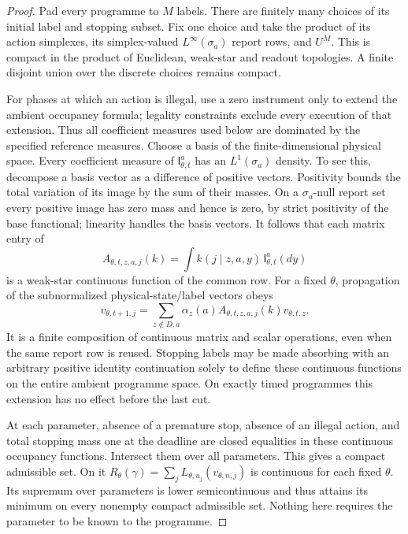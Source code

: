 \begin{proof}
Pad every programme to $M$ labels. There are finitely many choices of its initial label and stopping subset. Fix one choice and take the product of its action simplexes, its simplex-valued $L^\infty(\sigma_a)$ report rows, and $U^M$. This is compact in the product of Euclidean, weak-star and readout topologies. A finite disjoint union over the discrete choices remains compact.

For phases at which an action is illegal, use a zero instrument only to extend the ambient occupancy formula; legality constraints exclude every execution of that extension. Thus all coefficient measures used below are dominated by the specified reference measures. Choose a basis of the finite-dimensional physical space. Every coefficient measure of $\mathsf I_{\theta,t}^a$ has an $L^1(\sigma_a)$ density. To see this, decompose a basis vector as a difference of positive vectors. Positivity bounds the total variation of its image by the sum of their masses. On a $\sigma_a$-null report set every positive image has zero mass and hence is zero, by strict positivity of the base functional; linearity handles the basis vectors. It follows that each matrix entry of
\[
 A_{\theta,t,z,a,j}(k)
       =\int k(j\mid z,a,y)\,\mathsf I_{\theta,t}^a(dy)
\]
is a weak-star continuous function of the common row. For a fixed $\theta$, propagation of the subnormalized physical-state/label vectors obeys
\[
 v_{\theta,t+1,j}=
       \sum_{z\notin D,a}\alpha_z(a)
                        A_{\theta,t,z,a,j}(k)v_{\theta,t,z}.
\]
It is a finite composition of continuous matrix and scalar operations, even when the same report row is reused. Stopping labels may be made absorbing with an arbitrary positive identity continuation solely to define these continuous functions on the entire ambient programme space. On exactly timed programmes this extension has no effect before the last cut.

At each parameter, absence of a premature stop, absence of an illegal action, and total stopping mass one at the deadline are closed equalities in these continuous occupancy functions. Intersect them over all parameters. This gives a compact admissible set. On it $R_\theta(\gamma)=\sum_j L_{\theta,u_j}(v_{\theta,n,j})$ is continuous for each fixed $\theta$. Its supremum over parameters is lower semicontinuous and thus attains its minimum on every nonempty compact admissible set. Nothing here requires the parameter to be known to the programme.


\end{proof}
